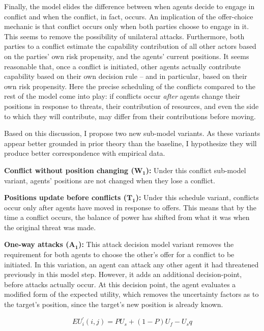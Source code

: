 Finally, the model elides the difference between when agents decide to engage in conflict and when the conflict, in fact, occurs. An implication of the offer-choice mechanic is that conflict occurs only when both parties choose to engage in it. This seems to remove the possibility of unilateral attacks. Furthermore, both parties to a conflict estimate the capability contribution of all other actors based on the parties' own risk propensity, and the agents' current positions. It seems reasonable that, once a conflict is initiated, other agents actually contribute capability based on their own decision rule -- and in particular, based on their own risk propensity. Here the precise scheduling of the conflicts compared to the rest of the model come into play: if conflicts occur \emph{after} agents change their positions in response to threats, their contribution of resources, and even the side to which they will contribute, may differ from their contributions before moving.

Based on this discussion, I propose two new sub-model variants. As these variants appear better grounded in prior theory than the baseline, I hypothesize they will produce better correspondence with empirical data.

\textbf{Conflict without position changing ($\mathbf{W_1}$):} Under this conflict sub-model variant, agents' positions are not changed when they lose a conflict. 

\textbf{Positions update before conflicts ($\mathbf{T_1}$):} Under this schedule variant, conflicts occur only after agents have moved in response to offers. This means that by the time a conflict occurs, the balance of power has shifted from what it was when the original threat was made.

\textbf{One-way attacks ($\mathbf{A_1}$):} This attack decision model variant removes the requirement for both agents to choose the other's offer for a conflict to be initiated. In this variation, an agent can attack any other agent it had threatened previously in this model step. However, it adds an additional decision-point, before attacks actually occur. At this decision point, the agent evaluates a modified form of the expected utility, which removes the uncertainty factors as to the target's position, since the target's new position is already known.

\begin{equation}
    EU_i^\prime(i,j) = P U_s + (1-P)U_f - U_sq
\end{equation}

